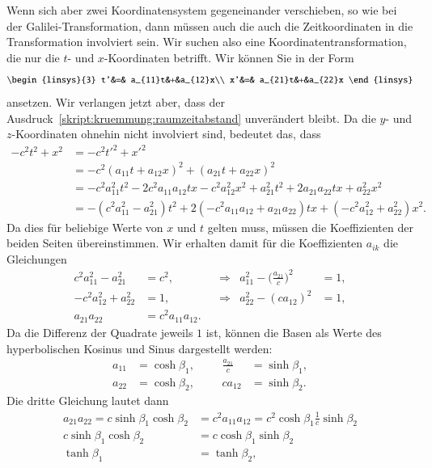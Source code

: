 Wenn sich aber zwei Koordinatensystem gegeneinander verschieben,
so wie bei der Galilei-Transformation, dann müssen auch die auch
die Zeitkoordinaten in die Transformation involviert sein.
Wir suchen also eine Koordinatentransformation, die nur die
$t$- und $x$-Koordinaten betrifft.
Wir können Sie in der Form
\begin{equation}
\begin{linsys}{3}
t'&=& a_{11}t&+&a_{12}x\\
x'&=& a_{21}t&+&a_{22}x
\end{linsys}
\end{equation}
ansetzen.
Wir verlangen jetzt aber, dass der
Ausdruck~\eqref{skript:kruemmung:raumzeitabstand}
unverändert bleibt.
Da die $y$- und $z$-Koordinaten ohnehin nicht involviert sind, bedeutet
das, dass
\begin{align*}
-c^2t^2 + x^2
&=
-c^2t'^2 + x'^2
\\
&=
-c^2(a_{11}t+a_{12}x)^2 + (a_{21}t+a_{22}x)^2
\\
&=
-c^2a_{11}^2t^2 -2c^2a_{11}a_{12}tx -c^2a_{12}^2x^2
+a_{21}^2t^2+2a_{21}a_{22}tx+a_{22}^2x^2
\\
&=
-(c^2a_{11}^2 - a_{21}^2)t^2
+2(-c^2a_{11}a_{12}+a_{21}a_{22})tx
+(-c^2a_{12}^2 + a_{22}^2)x^2.
\end{align*}
Da dies für beliebige Werte von $x$ und $t$ gelten muss, müssen die
Koeffizienten der beiden Seiten übereinstimmen. 
Wir erhalten damit für die Koeffizienten $a_{ik}$ die Gleichungen
\[
\begin{aligned}
c^2a_{11}^2-a_{21}^2&=c^2,
&&\Rightarrow&
a_{11}^2
-
\biggl(\frac{a_{21}}{c}\biggr)^2
&=1,
\\
-c^2a_{12}^2+a_{22}^2&=1,
&&\Rightarrow
&
a_{22}^2 - (ca_{12})^2&=1,
\\
a_{21}a_{22}&=c^2a_{11}a_{12}.
\end{aligned}
\]
Da die Differenz der Quadrate jeweils $1$ ist, können die Basen
als Werte des hyperbolischen Kosinus und Sinus dargestellt werden:
\[
\begin{aligned}
a_{11}&=\cosh\beta_1, &&&\frac{a_{21}}{c}&=\sinh\beta_1,
\\
a_{22}&=\cosh\beta_2,&&&ca_{12}&=\sinh\beta_2.
\end{aligned}
\]
Die dritte Gleichung lautet dann
\begin{align*}
a_{21}a_{22}=c\sinh\beta_1\cosh\beta_2
&=
c^2a_{11}a_{12}=c^2\cosh\beta_1\frac1c\sinh\beta_2
\\
c\sinh\beta_1\cosh\beta_2
&=
c\cosh\beta_1\sinh\beta_2
\\
\tanh\beta_1&=\tanh\beta_2,
\end{align*}
